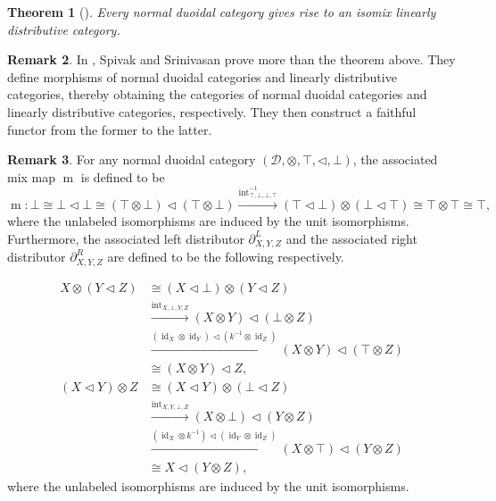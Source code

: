 \documentclass{article}
\numberwithin{equation}{section}
\newtheorem{thm}{Theorem}[section]
\theoremstyle{definition}
\newtheorem{rem}[thm]{Remark}
\begin{document}
\begin{thm}[\cite{SS, GF}]\label{thm:duoidal-isomix}
Every normal duoidal category gives rise to an isomix linearly distributive category.
\end{thm}

\begin{rem}
In \cite{SS}, Spivak and Srinivasan prove more than the theorem above.
They define morphisms of normal duoidal categories and linearly distributive categories, thereby obtaining the categories of normal duoidal categories and linearly distributive categories, respectively.
They then construct a faithful functor from the former to the latter.
\end{rem}


\begin{rem}For any normal duoidal category $(\mathcal{D}, \otimes, \top, \triangleleft, \bot)$, the associated mix map $\operatorname{m}$ is defined to be
\[\operatorname{m}:\bot\cong\bot\triangleleft\bot\cong(\top\otimes\bot)\triangleleft(\top\otimes\bot)\xrightarrow{\operatorname{int}^{-1}_{\top, \bot, \bot, \top}}(\top\triangleleft\bot)\otimes(\bot\triangleleft\top)\cong\top\otimes\top\cong\top,\]
where the unlabeled isomorphisms are induced by the unit isomorphisms.
Furthermore, the associated left distributor $\partial_{X, Y, Z}^{L}$ and the associated right distributor $\partial_{X, Y, Z}^{R}$ are defined to be the following respectively.



\[
\begin{aligned}
X\otimes(Y\triangleleft Z)
&\cong (X\triangleleft\bot)\otimes(Y\triangleleft Z) \\
&\xrightarrow{\operatorname{int}_{X,\bot,Y,Z}}
(X\otimes Y)\triangleleft(\bot\otimes Z) \\
&\xrightarrow{(\operatorname{id}_{X}\otimes\operatorname{id}_{Y})
\triangleleft(k^{-1}\otimes\operatorname{id}_{Z})}
(X\otimes Y)\triangleleft(\top\otimes Z) \\
&\cong (X\otimes Y)\triangleleft Z,
\end{aligned}
\]
\[
\begin{aligned}
(X\triangleleft Y)\otimes Z
&\cong (X\triangleleft Y)\otimes(\bot\triangleleft Z) \\
&\xrightarrow{\operatorname{int}_{X, Y, \bot, Z}}
(X\otimes \bot)\triangleleft(Y\otimes Z) \\
&\xrightarrow{(\operatorname{id}_{X}\otimes k^{-1})
\triangleleft(\operatorname{id}_{Y}\otimes\operatorname{id}_{Z})}
(X\otimes \top)\triangleleft(Y\otimes Z) \\
&\cong X\triangleleft (Y\otimes Z),
\end{aligned}
\]
where the unlabeled isomorphisms are induced by the unit isomorphisms.
\end{rem}
\end{document}
